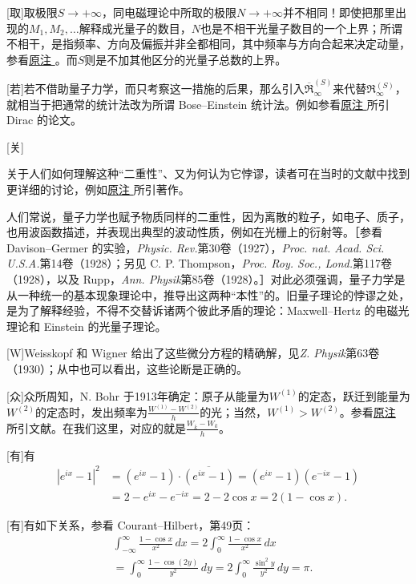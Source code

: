 \documentclass[fontsize=13pt,twoside,openany,headings=normal,parskip=false,bookmarkpackage=false,DIV=calc]{scrbook}
\begin{document}
[取]{取极限$S\to+\infty$，同电磁理论中所取的极限$N\to+\infty$并不相同！即使把那里出现的$M_1,\allowbreak M_2,\allowbreak \ldots$解释成光量子的数目，$N$也是不相干光量子数目的一个上界；所谓不相干，是指频率、方向及偏振并非全都相同，其中频率与方向合起来决定动量，参看\CJKglue \hyperlink{note-145}{原注 }。而$S$则是不加其他区分的光量子总数的上界。}

[若]{若不借助量子力学，而只考察这一措施的后果，那么引入$\overline{\mathfrak R}^{(S)}_\infty$来代替$\mathfrak R^{(S)}_\infty$，就相当于把通常的统计法改为所谓 Bose--Einstein 统计法。例如参看\CJKglue \hyperlink{note-138}{原注 } 所引 Dirac 的论文。}

[关]{关于人们如何理解这种“二重性”、又为何认为它悖谬，读者可在当时的文献中找到更详细的讨论，例如\CJKglue \hyperlink{note-6}{原注 } 所引著作。

人们常说，量子力学也赋予物质同样的二重性，因为离散的粒子，如电子、质子，也用波函数描述，并表现出典型的波动性质，例如在光栅上的衍射等。［参看 Davison--Germer 的实验，\emph{Physic. Rev.}第30卷（1927），\emph{Proc. nat. Acad. Sci. U.S.A.}第14卷（1928）；另见 C. P. Thompson，\emph{Proc. Roy. Soc., Lond.}第117卷（1928），以及 Rupp，\emph{Ann. Physik}第85卷（1928）。］对此必须强调，量子力学是从一种统一的基本现象理论中，推导出这两种“本性”的。旧量子理论的悖谬之处，是为了解释经验，不得不交替诉诸两个彼此矛盾的理论：Maxwell--Hertz 的电磁光理论和 Einstein 的光量子理论。}

[W]{Weisskopf 和 Wigner 给出了这些微分方程的精确解，见\emph{Z. Physik}第63卷（1930）；从中也可以看出，这些论断是正确的。}

[众]{众所周知，N. Bohr 于1913年确定：原子从能量为$W^{(1)}$的定态，跃迁到能量为$W^{(2)}$的定态时，发出频率为$\frac{W^{(1)}-W^{(2)}}h$的光；当然，$W^{(1)}>W^{(2)}$。参看\CJKglue \hyperlink{note-5}{原注 } 所引文献。在我们这里，对应的就是$\frac{W_{\bar k}-W_k}h$。}

[有]{有
\begin{align*}
|e^{ix}-1|^2&=(e^{ix}-1)\cdot\overline{(e^{ix}-1)}=(e^{ix}-1)(e^{-ix}-1)\\
&=2-e^{ix}-e^{-ix}=2-2\cos x=2(1-\cos x).
\end{align*}}

[有]{\hypertarget{origpage-255}{}\label{origpage-255}有如下关系，参看 Courant--Hilbert，第49页：
\begin{align*}
&\int_{-\infty}^{\infty}\frac{1-\cos x}{x^2}\,dx
=2\int_0^{\infty}\frac{1-\cos x}{x^2}\,dx\\
&=\int_0^{\infty}\frac{1-\cos(2y)}{y^2}\,dy
=2\int_0^{\infty}\frac{\sin^2y}{y^2}\,dy=\pi.
\end{align*}}
\end{document}
